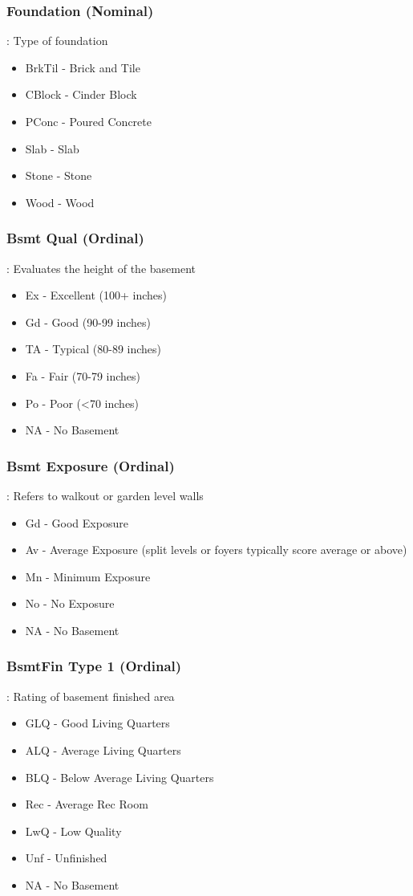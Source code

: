 \documentclass[sigconf]{acmart}
\begin{document}
	\subsubsection{Foundation (Nominal)}: Type of foundation
	\begin{itemize}
		\item  BrkTil - Brick and Tile
		\item  CBlock - Cinder Block
		\item  PConc - Poured Concrete
		\item  Slab - Slab
		\item  Stone - Stone
		\item  Wood - Wood
	\end{itemize}

	\subsubsection{Bsmt Qual (Ordinal)}: Evaluates the height of the basement
	\begin{itemize}
		\item  Ex - Excellent (100+ inches)
		\item  Gd - Good (90-99 inches)
		\item  TA - Typical (80-89 inches)
		\item  Fa - Fair (70-79 inches)
		\item  Po - Poor (<70 inches)
		\item  NA - No Basement
	\end{itemize}
	
	\subsubsection{Bsmt Exposure (Ordinal)}: Refers to walkout or garden level walls
	\begin{itemize}
		\item  Gd - Good Exposure
		\item  Av - Average Exposure (split levels or foyers typically score average or above)
		\item  Mn - Minimum Exposure
		\item  No - No Exposure
		\item  NA - No Basement
	\end{itemize}
	
	\subsubsection{BsmtFin Type 1 (Ordinal)}: Rating of basement finished area
	\begin{itemize}
		\item  GLQ - Good Living Quarters
		\item  ALQ - Average Living Quarters
		\item  BLQ - Below Average Living Quarters
		\item  Rec - Average Rec Room
		\item  LwQ - Low Quality
		\item  Unf - Unfinished
		\item  NA - No Basement
	\end{itemize}
\end{document}
